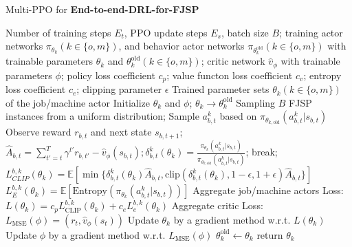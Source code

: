 \begin{algorithm}
	\caption{Multi-PPO for \textbf{End-to-end-DRL-for-FJSP}} \label{algorithm:multippo}
	\begin{algorithmic}[1]
	\renewcommand{\algorithmicrequire}{\hspace*{\algorithmicindent}  \textbf{Input:}}
	\renewcommand{\algorithmicensure}{\hspace*{\algorithmicindent}  \textbf{Output:}}
	\Require Number of training steps $E_t$, PPO update steps $E_s$, batch size $B$; training actor networks $\pi_{\theta_k} (k \in \{o,m\})$, and behavior actor networks $\pi_{\theta^\text{old}_k} (k \in \{ o,m\})$ with trainable parameters $\theta_k$ and $\theta^\text{old}_k (k \in \{ o,m \})$; critic network $\hat{v}_\phi$ with trainable parameters $\phi$; policy loss coefficient $c_p$; value functon loss coefficient $c_v$; entropy loss coefficient $c_e$; clipping parameter $\epsilon$
	\Ensure Trained parameter sets $\theta_k (k \in \{ o,m \})$ of the job/machine actor
	\State Initialize $\theta_k$ and $\phi$; $\theta_k \rightarrow \theta^\text{old}_k$ 
		\State Sampling $B$ FJSP instances from a uniform distribution;
			\State Sample $a_{b,t}^k$ based on $\pi_{\theta_{k,\text{old}}} \left( a_{b,t}^k | s_{b,t}\right)$
			\State Observe reward $r_{b,t}$ and next state $s_{b,t+1}$;
			\State $\hat{A}_{b,t} = \sum_{t'=t}^T\gamma^{t'}r_{b,t'} - \hat{v}_\phi(s_{b,t}); \delta_{b,t}^k(\theta_k) = \frac{\pi_{\theta_k}\left(a^k_{b,t} | s_{b,t}\right)}{\pi_{\theta_{k,\text{old}}}\left(a^k_{b,t} | s_{b,t}\right)}$;
                \State break;
            \EndIf
            \EndFor
        \State $L_{CLIP}^{b,k}(\theta_k) = \mathbb{E} \left [ \min \{\delta_{b,t}^k(\theta_k)\hat{A}_{b,t}, \text{clip}\left( \delta_{b,t}^k(\theta_k), 1-\epsilon, 1+\epsilon\right) \hat{A}_{b,t} \} \right ]$
        \State $L_E^{b,k}(\theta_k) = \mathbb{E} \left [ \text{Entropy}\left(\pi_{\theta_k}\left(a_{b,t}^k | s_{b,t}\right)\right)\right ]$
        \State Aggregate job/machine actors Loss: $L(\theta_k) = c_p L_\text{CLIP}^{b,k}(\theta_k) + c_e L_e^{b,k}(\theta_k)$
        \State Aggregate critic Loss: $L_\text{MSE}(\phi)=(r_t, \hat{v}_\phi(s_t))$
		\EndFor
        \State Update $\theta_k$ by a gradient method w.r.t. $L(\theta_k)$ 
        \State Update $\phi$ by a gradient method w.r.t. $L_\text{MSE}(\phi)$
    \EndFor
    \State $\theta_k^\text{old} \gets \theta_k$
	\EndFor
	\State return $\theta_k$
\end{algorithmic}
\end{algorithm}

